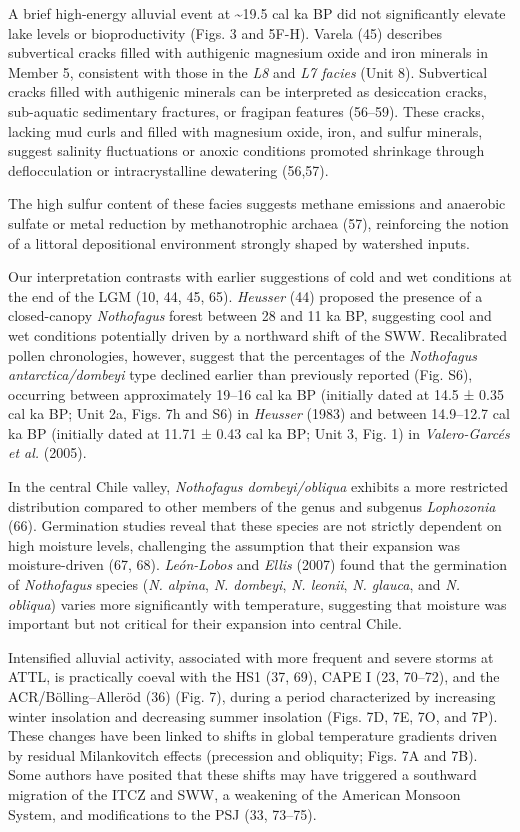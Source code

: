 \documentclass[
]{article}
\begin{document}
A brief high-energy alluvial event at \textasciitilde19.5 cal ka BP did
not significantly elevate lake levels or bioproductivity (Figs. 3 and
5F-H). Varela (45) describes subvertical cracks filled with authigenic
magnesium oxide and iron minerals in Member 5, consistent with those in
the \emph{L8} and \emph{L7 facies} (Unit 8). Subvertical cracks filled
with authigenic minerals can be interpreted as desiccation cracks,
sub-aquatic sedimentary fractures, or fragipan features (56--59). These
cracks, lacking mud curls and filled with magnesium oxide, iron, and
sulfur minerals, suggest salinity fluctuations or anoxic conditions
promoted shrinkage through deflocculation or intracrystalline dewatering
(56,57).

The high sulfur content of these facies suggests methane emissions and
anaerobic sulfate or metal reduction by methanotrophic archaea (57),
reinforcing the notion of a littoral depositional environment strongly
shaped by watershed inputs.

Our interpretation contrasts with earlier suggestions of cold and wet
conditions at the end of the LGM (10, 44, 45, 65). \emph{Heusser} (44)
proposed the presence of a closed-canopy \emph{Nothofagus} forest
between 28 and 11 ka BP, suggesting cool and wet conditions potentially
driven by a northward shift of the SWW. Recalibrated pollen
chronologies, however, suggest that the percentages of the
\emph{Nothofagus antarctica/dombeyi} type declined earlier than
previously reported (Fig. S6), occurring between approximately 19--16
cal ka BP (initially dated at 14.5 ± 0.35 cal ka BP; Unit 2a, Figs. 7h
and S6) in \emph{Heusser} (1983) and between 14.9--12.7 cal ka BP
(initially dated at 11.71 ± 0.43 cal ka BP; Unit 3, Fig. 1) in
\emph{Valero-Garcés et al.} (2005).

In the central Chile valley, \emph{Nothofagus dombeyi/obliqua} exhibits
a more restricted distribution compared to other members of the genus
and subgenus \emph{Lophozonia} (66). Germination studies reveal that
these species are not strictly dependent on high moisture levels,
challenging the assumption that their expansion was moisture-driven (67,
68). \emph{León-Lobos} and \emph{Ellis} (2007) found that the
germination of \emph{Nothofagus} species (\emph{N. alpina}, \emph{N.
dombeyi}, \emph{N. leonii}, \emph{N. glauca}, and \emph{N. obliqua})
varies more significantly with temperature, suggesting that moisture was
important but not critical for their expansion into central Chile.

Intensified alluvial activity, associated with more frequent and severe
storms at ATTL, is practically coeval with the HS1 (37, 69), CAPE I (23,
70--72), and the ACR/Bölling--Alleröd (36) (Fig. 7), during a period
characterized by increasing winter insolation and decreasing summer
insolation (Figs. 7D, 7E, 7O, and 7P). These changes have been linked to
shifts in global temperature gradients driven by residual Milankovitch
effects (precession and obliquity; Figs. 7A and 7B). Some authors have
posited that these shifts may have triggered a southward migration of
the ITCZ and SWW, a weakening of the American Monsoon System, and
modifications to the PSJ (33, 73--75).
\end{document}
